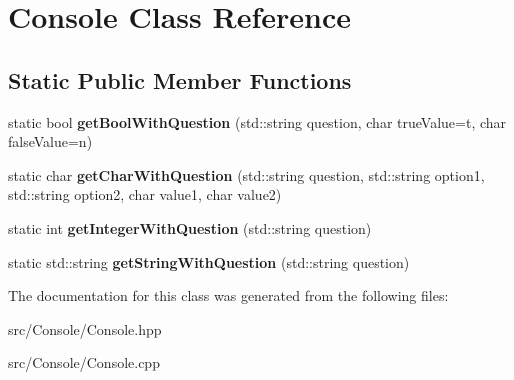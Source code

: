 \hypertarget{class_console}{}\section{Console Class Reference}
\label{class_console}
\subsection*{Static Public Member Functions}
\begin{DoxyCompactItemize}
\item 
\mbox{\label{class_console_a6f8ac9c6dd5aadd41afab40e27df4810}} 
static bool {\bfseries get\+Bool\+With\+Question} (std\+::string question, char true\+Value=\textquotesingle{}t\textquotesingle{}, char false\+Value=\textquotesingle{}n\textquotesingle{})
\item 
\mbox{\label{class_console_a9c1eaf9f03786ae1b5e84c1a3fa968ca}} 
static char {\bfseries get\+Char\+With\+Question} (std\+::string question, std\+::string option1, std\+::string option2, char value1, char value2)
\item 
\mbox{\label{class_console_adee581fc6f588e253a9fcefb2d986c12}} 
static int {\bfseries get\+Integer\+With\+Question} (std\+::string question)
\item 
\mbox{\label{class_console_a84d71db4ba83dadb2a53c39cc3578db9}} 
static std\+::string {\bfseries get\+String\+With\+Question} (std\+::string question)
\end{DoxyCompactItemize}


The documentation for this class was generated from the following files\+:\begin{DoxyCompactItemize}
\item 
src/\+Console/Console.\+hpp\item 
src/\+Console/Console.\+cpp\end{DoxyCompactItemize}
